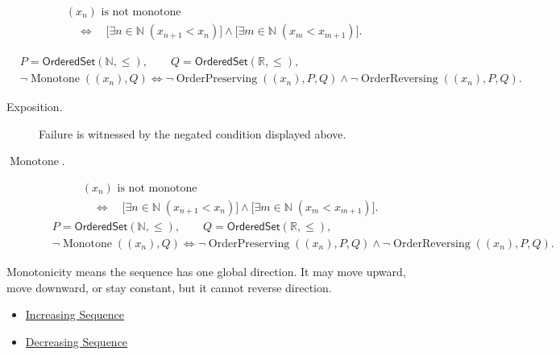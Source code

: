 \begin{remark*}
\[
\begin{aligned}
&(x_n)\text{ is not monotone}\\
&\quad\Longleftrightarrow\quad
\bigl[\exists n\in\mathbb{N}\;(x_{n+1}<x_n)\bigr]
\land
\bigl[\exists m\in\mathbb{N}\;(x_m<x_{m+1})\bigr].
\end{aligned}
\]
\end{remark*}

\begin{remark*}
\[
\begin{aligned}
&P=\mathsf{OrderedSet}(\mathbb{N},\leq),\qquad
Q=\mathsf{OrderedSet}(\mathbb{R},\leq),\\
&\neg\operatorname{Monotone}((x_n),Q)
\Longleftrightarrow
\neg\operatorname{OrderPreserving}((x_n),P,Q)
\land
\neg\operatorname{OrderReversing}((x_n),P,Q).
\end{aligned}
\]
\end{remark*}
\begin{remark*}
\begin{description}
  \item[Exposition.]
Failure is witnessed by the negated condition displayed above.
  \item[\(\operatorname{Monotone}.\)]
\[
\begin{aligned}
&(x_n)\text{ is not monotone}\\
&\quad\Longleftrightarrow\quad
\bigl[\exists n\in\mathbb{N}\;(x_{n+1}<x_n)\bigr]
\land
\bigl[\exists m\in\mathbb{N}\;(x_m<x_{m+1})\bigr].
\end{aligned}
\]
\[
\begin{aligned}
&P=\mathsf{OrderedSet}(\mathbb{N},\leq),\qquad
Q=\mathsf{OrderedSet}(\mathbb{R},\leq),\\
&\neg\operatorname{Monotone}((x_n),Q)
\Longleftrightarrow
\neg\operatorname{OrderPreserving}((x_n),P,Q)
\land
\neg\operatorname{OrderReversing}((x_n),P,Q).
\end{aligned}
\]
\end{description}
\end{remark*}

\begin{remark*}[Interpretation]
Monotonicity means the sequence has one global direction. It may move upward,
move downward, or stay constant, but it cannot reverse direction.
\end{remark*}

\begin{dependencies}
\begin{itemize}
  \item \hyperref[def:increasing-sequence]{Increasing Sequence}
  \item \hyperref[def:decreasing-sequence]{Decreasing Sequence}
\end{itemize}
\end{dependencies}


